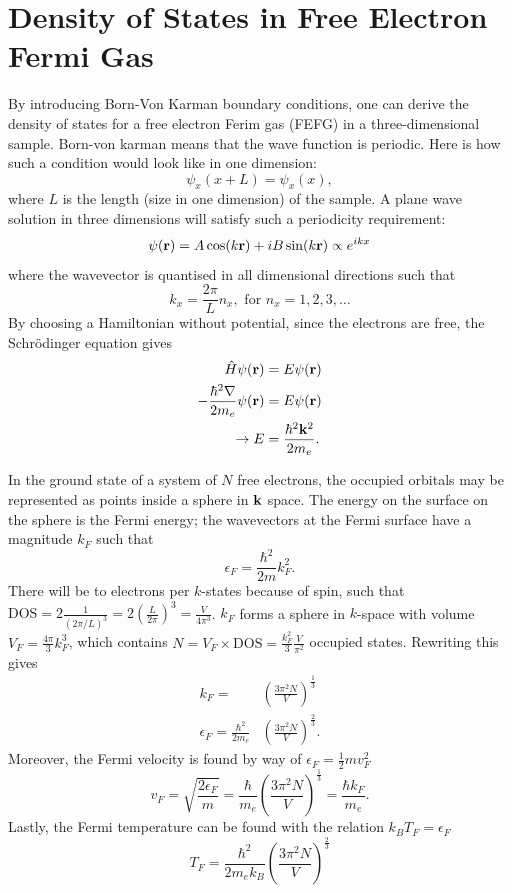 \documentclass[11pt]{amsart}
\begin{document}
\section{Density of States in Free Electron Fermi Gas}
By introducing Born-Von Karman boundary conditions, one can derive the density of states for a free electron Ferim gas (FEFG) in a three-dimensional sample. Born-von karman means that the wave function is periodic. Here is how such a condition would look like in one dimension:
\begin{equation}
\psi_x(x + L) = \psi_x(x),
\end{equation}
where $L$ is the length (size in one dimension) of the sample. A plane wave solution in three dimensions will satisfy such a periodicity requirement:
\begin{equation}
\psi(\vb{r}) = A\cos(k\vb{r}) + iB\sin(k\vb{r}) \propto e^{ikx}
\end{equation}
where the wavevector is quantised in all dimensional directions such that
\begin{equation*}
k_x = \frac{2\pi}{L}n_x, \text{ for } n_x = 1, 2, 3, \dots
\end{equation*}
By choosing a Hamiltonian without potential, since the electrons are free, the Schrödinger equation gives
\begin{align*}
\hat{H}\psi(\vb{r}) &= E\psi(\vb{r}) \\
-\frac{\hbar^2\nabla}{2m_e}\psi(\vb{r}) &= E\psi(\vb{r}) \\
\rightarrow E &= \frac{\hbar^2 \vb{k}^2}{2m_e}.
\end{align*}

In the ground state of a system of $N$ free electrons, the occupied orbitals may be represented as points inside a sphere in $\vb{k}$ space. The energy on the surface on the sphere is the Fermi energy; the wavevectors at the Fermi surface have a magnitude $k_F$ such that
\begin{equation}
\epsilon_F = \frac{\hbar^2}{2m}k_F^2.
\end{equation}
There will be to electrons per $k$-states because of spin, such that $\text{DOS} = 2\frac{1}{(2\pi/L)^3} = 2\left(\frac{L}{2\pi} \right)^3 = \frac{V}{4\pi^3}$. $k_F$  forms a sphere in $k$-space with volume $V_F = \frac{4\pi}{3}k_F^3$, which contains $N = V_F \times \text{DOS} = \frac{k_F^2}{3}\frac{V}{\pi^2}$ occupied states. Rewriting this gives
\begin{align}
k_F = &\left(\frac{3\pi^2N}{V} \right)^{\frac{1}{3}} \\
\epsilon_F =\frac{\hbar^2}{2m_e} &\left(\frac{3\pi^2N}{V} \right)^{\frac{2}{3}}.
\end{align}
Moreover, the Fermi velocity is found by way of $\epsilon_F = \frac{1}{2}mv_F^2$
\begin{equation}
v_F = \sqrt{\frac{2\epsilon_F}{m}} = \frac{\hbar}{m_e}\left(\frac{3\pi^2 N}{V} \right)^{\frac{1}{3}} = \frac{\hbar k_F}{m_e}.
\end{equation}
Lastly, the Fermi temperature can be found with the relation $k_BT_F = \epsilon_F$
\begin{equation}
T_F = \frac{\hbar^2}{2m_ek_B}\left(\frac{3\pi^2 N}{V} \right)^{\frac{2}{3}}
\end{equation}
\end{document}
